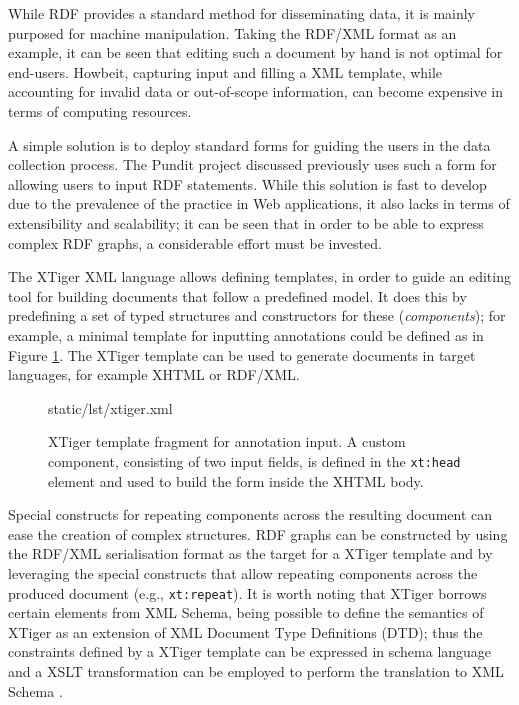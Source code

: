 While RDF provides a standard method for disseminating data, it is mainly
purposed for machine manipulation. Taking the RDF/XML format as an example, it
can be seen that editing such a document by hand is not optimal for end-users.
Howbeit, capturing input and filling a XML template, while accounting
for invalid data or out-of-scope information, can become expensive in terms of
computing resources.

A simple solution is to deploy standard forms for guiding the users in the data
collection process. The Pundit project discussed previously uses such a form
for allowing users to input RDF statements. While this solution is fast to
develop due to the prevalence of the practice in Web applications, it also
lacks in terms of extensibility and scalability; it can be seen that in order
to be able to express complex RDF graphs, a considerable effort must be
invested.

The XTiger \cite{ref:xtiger} XML language allows defining templates, in order
to guide an editing tool for building documents that follow a predefined model.
It does this by predefining a set of typed structures and constructors for
these (\textit{components}); for example, a minimal template for inputting
annotations could be defined as in Figure \ref{lst:xtiger}. The XTiger template
can be used to generate documents in target languages, for example XHTML or
RDF/XML.

\begin{figure}[!ht]
  
    {static/lst/xtiger.xml}
  \caption[XTiger template fragment for annotation input]
            {XTiger template fragment for annotation input. A custom component,
             consisting of two input fields, is defined in the \texttt{xt:head}
             element and used to build the form inside the XHTML body.}
  \label{lst:xtiger}
\end{figure}

Special constructs for repeating components across the resulting document can
ease the creation of complex structures. RDF graphs can be constructed by using
the RDF/XML serialisation format as the target for a XTiger template and by
leveraging the special constructs that allow repeating components across the
produced document (e.g., \texttt{xt:repeat}). It is worth noting that XTiger
borrows certain elements from XML Schema, being possible to define the
semantics of XTiger as an extension of XML Document Type Definitions (DTD);
thus the constraints defined by a XTiger template can be expressed in schema
language and a XSLT transformation can be employed to perform the translation
to XML Schema \cite{ref:quint}.

